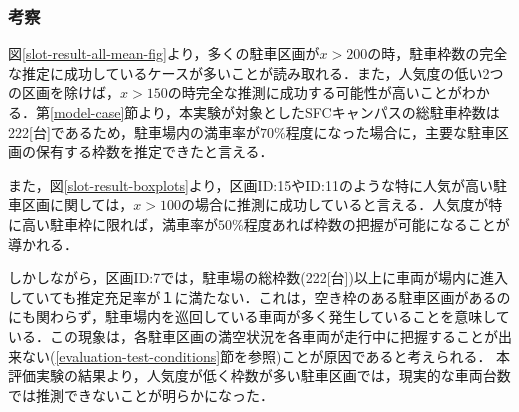 \subsubsection{考察}
図\ref{slot-result-all-mean-fig}より，多くの駐車区画が$x>200$の時，駐車枠数の完全な推定に成功しているケースが多いことが読み取れる．また，人気度の低い2つの区画を除けば，$x>150$の時完全な推測に成功する可能性が高いことがわかる．第\ref{model-case}節より，本実験が対象としたSFCキャンパスの総駐車枠数は222[台]であるため，駐車場内の満車率が$70\%$程度になった場合に，主要な駐車区画の保有する枠数を推定できたと言える．


また，図\ref{slot-result-boxplots}より，区画ID:15やID:11のような特に人気が高い駐車区画に関しては，$x>100$の場合に推測に成功していると言える．人気度が特に高い駐車枠に限れば，満車率が$50\%$程度あれば枠数の把握が可能になることが導かれる．


しかしながら，区画ID:7では，駐車場の総枠数(222[台])以上に車両が場内に進入していても推定充足率が１に満たない．これは，空き枠のある駐車区画があるのにも関わらず，駐車場内を巡回している車両が多く発生していることを意味している．この現象は，各駐車区画の満空状況を各車両が走行中に把握することが出来ない(\ref{evaluation-test-conditions}節を参照)ことが原因であると考えられる．
本評価実験の結果より，人気度が低く枠数が多い駐車区画では，現実的な車両台数では推測できないことが明らかになった．